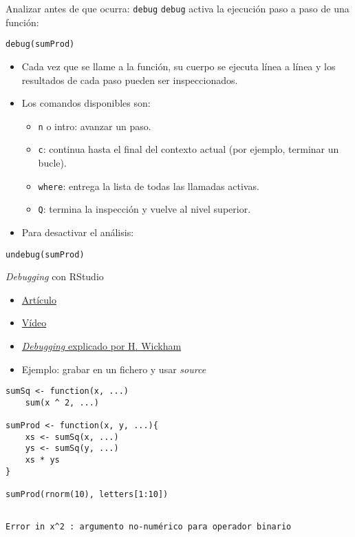 \documentclass[xcolor={usenames,svgnames,dvipsnames}]{beamer}
\begin{document}
\begin{frame}[label={sec:orgb6c7b9a},fragile]{Analizar antes de que ocurra: \texttt{debug}}
 \texttt{debug} activa la ejecución paso a paso de una función:
\lstset{language=r,label= ,caption= ,captionpos=b,numbers=none}
\begin{lstlisting}
debug(sumProd)
\end{lstlisting}

\begin{itemize}
\item Cada vez que se llame a la función, su cuerpo se ejecuta línea a línea y los resultados de cada paso pueden ser inspeccionados.
\item Los comandos disponibles son:
\begin{itemize}
\item \texttt{n} o intro: avanzar un paso.
\item \texttt{c}: continua hasta el final del contexto actual (por ejemplo,
terminar un bucle).
\item \texttt{where}: entrega la lista de todas las llamadas activas.
\item \texttt{Q}: termina la inspección y vuelve al nivel superior.
\end{itemize}
\item Para desactivar el análisis:
\end{itemize}
\lstset{language=r,label= ,caption= ,captionpos=b,numbers=none}
\begin{lstlisting}
undebug(sumProd)
\end{lstlisting}
\end{frame}

\begin{frame}[label={sec:orgfcb0a28},fragile]{\emph{Debugging} con RStudio}
 \begin{itemize}
\item \href{https://support.rstudio.com/hc/en-us/articles/205612627-Debugging-with-RStudio}{Artículo}
\item \href{https://vimeo.com/99375765https://vimeo.com/97831988}{Vídeo}
\end{itemize}
\begin{itemize}
\item \href{http://adv-r.had.co.nz/Exceptions-Debugging.html}{\emph{Debugging} explicado por H. Wickham}

\item Ejemplo: grabar en un fichero y usar \emph{source}
\end{itemize}
\lstset{language=r,label= ,caption= ,captionpos=b,numbers=none}
\begin{lstlisting}
sumSq <- function(x, ...)
    sum(x ^ 2, ...)

sumProd <- function(x, y, ...){
    xs <- sumSq(x, ...)
    ys <- sumSq(y, ...)
    xs * ys
}

sumProd(rnorm(10), letters[1:10])
\end{lstlisting}

\begin{verbatim}

Error in x^2 : argumento no-numérico para operador binario
\end{verbatim}
\end{frame}
\end{document}
